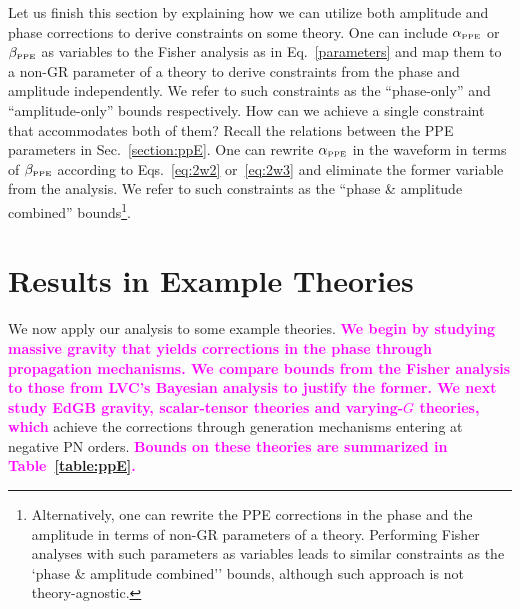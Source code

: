 \documentclass[prd,twocolumn,nofootinbib]{revtex4-1}
\newcommand{\PPE}{{\mbox{\tiny PPE}}}
\newcommand{\kent}[1]{\textcolor{magenta}{\textbf{#1}} }
\begin{document}
Let us finish this section by explaining how we can utilize both amplitude and phase corrections to derive constraints on some theory. One can include $\alpha_{\PPE}$ or $\beta_{\PPE}$ as variables to the Fisher analysis as in Eq.~\eqref{parameters} and map them to a non-GR parameter of a theory to derive constraints from the phase and amplitude independently. We refer to such constraints as  the ``phase-only'' and ``amplitude-only'' bounds respectively. How can we achieve a single constraint that accommodates both of them? Recall the relations between the PPE parameters in Sec.~\ref{section:ppE}. One can rewrite $\alpha_{\PPE}$ in the waveform in terms of $\beta_{\PPE}$ according to Eqs.~\eqref{eq:2w2} or~\eqref{eq:2w3} and eliminate the former variable from the analysis. %
We refer to such constraints as the ``phase \& amplitude combined'' bounds\footnote{Alternatively, one can rewrite the PPE corrections in the phase and the amplitude  in terms of non-GR parameters of a theory. Performing Fisher analyses with such parameters as variables leads to similar constraints as the `phase \& amplitude combined'' bounds, although such approach is not theory-agnostic.}.




\section{Results in Example Theories}\label{results}


We now apply our analysis to some example theories. \kent{We begin by studying massive gravity that yields corrections in the phase through propagation mechanisms. We compare bounds from the Fisher analysis to those from LVC's Bayesian analysis to justify the former. We next study EdGB gravity, scalar-tensor theories and varying-$G$ theories, which} achieve the corrections through generation mechanisms entering at negative PN orders.
\kent{Bounds on these theories are summarized in Table~\ref{table:ppE}.}
\end{document}
